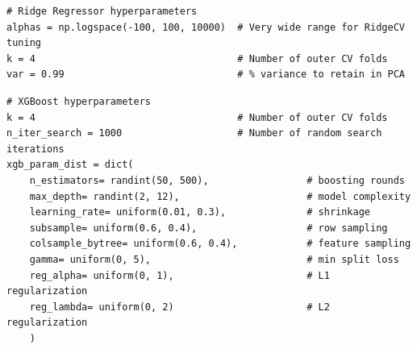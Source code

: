 \begin{verbatim}
# Ridge Regressor hyperparameters
alphas = np.logspace(-100, 100, 10000)  # Very wide range for RidgeCV tuning
k = 4                                   # Number of outer CV folds
var = 0.99                              # % variance to retain in PCA
\end{verbatim}

\begin{verbatim}
# XGBoost hyperparameters 
k = 4                                   # Number of outer CV folds
n_iter_search = 1000                    # Number of random search iterations
xgb_param_dist = dict(
    n_estimators= randint(50, 500),                 # boosting rounds
    max_depth= randint(2, 12),                      # model complexity
    learning_rate= uniform(0.01, 0.3),              # shrinkage
    subsample= uniform(0.6, 0.4),                   # row sampling
    colsample_bytree= uniform(0.6, 0.4),            # feature sampling
    gamma= uniform(0, 5),                           # min split loss
    reg_alpha= uniform(0, 1),                       # L1 regularization
    reg_lambda= uniform(0, 2)                       # L2 regularization
    )
\end{verbatim}

